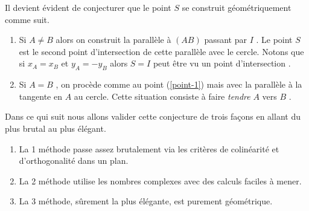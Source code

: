 Il devient évident de conjecturer que le point $S$ se construit géométriquement comme suit.

\begin{enumerate}
	\item \label{point-1} Si $A \neq B$ alors on construit la parallèle à $(AB)$ passant par $I$ . Le point $S$ est le second point d'intersection de cette parallèle avec le cercle.
	Notons que si $x_A = x_B$ et $y_A = -y_B$ alors $S = I$ peut être vu un point d'intersection .

	\item Si $A = B$ , on procède comme au point (\ref{point-1}) mais avec la parallèle à la tangente en $A$ au cercle. Cette situation consiste à faire \emph{\og tendre \fg} $A$ vers $B$ .
\end{enumerate}


\medskip

Dans ce qui suit nous allons valider cette conjecture de trois façons en allant du plus brutal au plus élégant.

\begin{enumerate}
	\item La 1\iere{} méthode passe assez brutalement via les critères de colinéarité et d'orthogonalité dans un plan.
	
	\item La 2\ieme{} méthode utilise les nombres complexes avec des calculs faciles à mener.
	
	\item La 3\ieme{} méthode, sûrement la plus élégante, est purement géométrique.
\end{enumerate}
